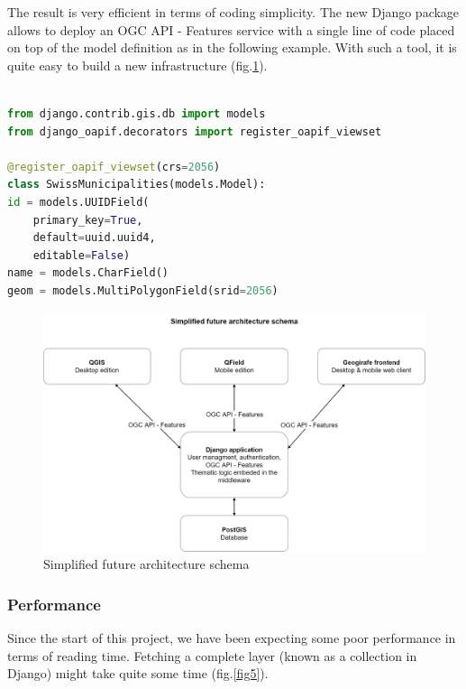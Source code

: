 \documentclass[runningheads]{llncs}
\begin{document}
The result is very efficient in terms of coding simplicity. The new Django package allows to deploy an OGC API - Features service with a single line of code placed on top of the model definition as in the following example. With such a tool, it is quite easy to build a new infrastructure (fig.\ref{fig4}).

\begin{lstlisting}[language=Python, caption=Python code sample]

from django.contrib.gis.db import models
from django_oapif.decorators import register_oapif_viewset

@register_oapif_viewset(crs=2056)
class SwissMunicipalities(models.Model):
id = models.UUIDField(
	primary_key=True,
	default=uuid.uuid4, 
	editable=False)
name = models.CharField()
geom = models.MultiPolygonField(srid=2056)
\end{lstlisting}


\begin{figure}
	\includegraphics[width=\textwidth]{future-architecture.png}
	\caption{Simplified future architecture schema} \label{fig4}
\end{figure}


\subsubsection{Performance}

Since the start of this project, we have been expecting some poor performance in terms of reading time. Fetching a complete layer (known as a collection in Django) might take quite some time (fig.\ref{fig5}).
\end{document}
